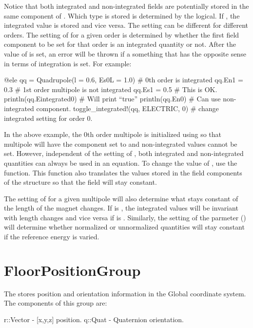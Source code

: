 Notice that both integrated
and non-integrated fields are potentially stored in the same component of .
Which type is stored is determined by the  logical. If , the integrated
value is stored and vice versa. The  setting can be different for different orders.
The setting of  for a given order is determined by whether the first field component
to be set for that order is an integrated quantity or not. After the value of  is set,
an error will be thrown if a something that has the opposite sense in terms of integration is 
set. For example:
\begin{example}
  @ele qq = Quadrupole(l = 0.6, Es0L = 1.0)  # 0th order is integrated
  qq.En1 = 0.3                  # 1st order multipole is not integrated
  qq.Es1 = 0.5                  # This is OK.
  println(qq.Eintegrated0)      # Will print ``true''
  println(qq.En0)               # Can use non-integrated component.
  toggle_integrated!(qq, ELECTRIC, 0)  # change integrated setting for order 0.
\end{example}
In the above example, the 0th order multipole is initialized using  so that
multipole will have the  component set to  and non-integrated values
cannot be set. However, independent of the setting of , both integrated and
non-integrated quantities can always be used in an equation. To change the value of ,
use the  function. This function also translates the values stored in the
field components of the structure so that the field will stay constant.

The setting of  for a given multipole will also determine what stays constant
of the length of the magnet changes. If  is , the integrated values
will be invariant with length changes and vice versa if  is . 
Similarly, the setting of the  parmeter () will determine 
whether normalized or unnormalized quantities will stay constant if the reference energy is varied.

\section{FloorPositionGroup}
\label{s:floor.pos.g}

The  stores position and orientation information in the Global coordinate 
system. The components of this group are:
\begin{example}
  r::Vector              - [x,y,z] position. 
  q::Quat                - Quaternion orientation. 
\end{example}

